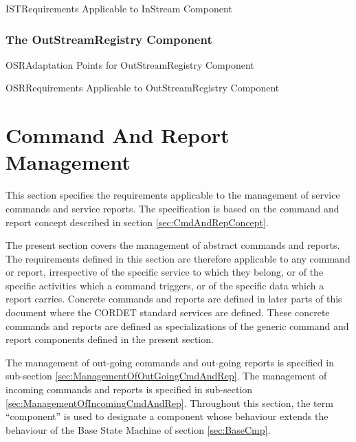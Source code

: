 \documentclass[a4paper,10pt]{article}
\let\stdsection\section
\renewcommand\section{\newpage\stdsection}
\newenvironment{cr_req}[2]
{%
\begin{longtable}{|l|p{9.8cm}|}
\caption{#2} \\
\hline
\rowcolor{light-gray}
\textbf{Req. ID} & \textbf{Requirement Text}\\
\hline\hline
\endfirsthead
\rowcolor{light-gray}
\textbf{Req. ID} & \textbf{Requirement Text}\\
\hline\hline
\endhead
\DTLforeach*[\DTLiseq{\cat}{#1}]{dbReq}{\cat=Category,\type=Type,\id=Id,\reqText=Text}
{\DTLiffirstrow{}{\\\hline}\cat-\id/\type & \textit{\reqText}}\\\hline
}
{\end{longtable}}
\newenvironment{cr_ap}[2]
{%
\begin{longtable}{|l|p{4.7cm}|p{4.9cm}|}
\caption{#2} \\
\hline
\rowcolor{light-gray}
\textbf{AP ID} & \textbf{Adaptation Point} & \textbf{Default Value}\\
\hline\hline
\endfirsthead
\rowcolor{light-gray}
\textbf{AP ID} & \textbf{Adaptation Point} & \textbf{Default Value}\\
\hline\hline
\endhead
\DTLforeach*[\DTLiseq{\cat}{#1}]{dbAP}{\cat=Category,\id=Id,\ap=AP,\defValue=DefValue}
{\DTLiffirstrow{}{\\\hline}\cat-\id & \ap & \defValue}\\\hline
}
{\end{longtable}}
\begin{document}
\pagebreak[4]
\begin{cr_req}{IST}{Requirements Applicable to InStream Component}
\end{cr_req}

\subsubsection{The OutStreamRegistry Component}\label{sec:OutStreamRegistry}


\begin{cr_ap}{OSR}{Adaptation Points for OutStreamRegistry Component}
\end{cr_ap}

\begin{cr_req}{OSR}{Requirements Applicable to OutStreamRegistry Component}
\end{cr_req}


\section{Command And Report Management}\label{sec:CmdAndRepManagement}

This section specifies the requirements applicable to the management of service commands and service reports. The specification is based on the command and report concept described in section \ref{sec:CmdAndRepConcept}. 

The present section covers the management of abstract commands and reports. The requirements defined in this section are therefore applicable to any command or report, irrespective of the specific service to which they belong, or of the specific activities which a command triggers, or of the specific data which a report carries. Concrete commands and reports are defined in later parts of this document where the CORDET standard services are defined. These concrete commands and reports are defined as specializations of the generic command and report components defined in the present section. 

The management of out-going commands and out-going reports is specified in sub-section \ref{sec:ManagementOfOutGoingCmdAndRep}. The management of incoming commands and reports is specified in sub-section \ref{sec:ManagementOfIncomingCmdAndRep}. Throughout this section, the term “component” is used to designate a component whose behaviour extends the behaviour of the Base State Machine of section \ref{sec:BaseCmp}. 
\end{document}
